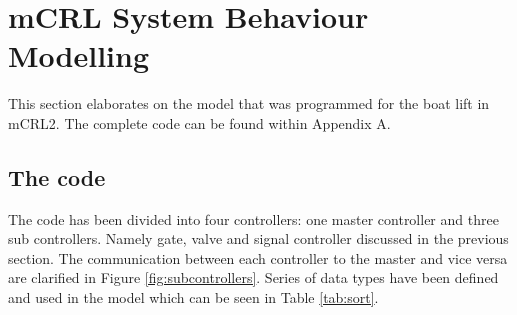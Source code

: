 \section{mCRL System Behaviour Modelling}
This section elaborates on the model that was programmed for the boat lift in mCRL2. The complete code can be found within Appendix A.
\subsection{The code}
The code has been divided into four controllers: one master controller and three sub controllers. Namely gate, valve and signal controller discussed in the previous section. The communication between each controller to the master and vice versa are clarified in Figure \ref{fig:subcontrollers}.
Series of data types have been defined and used in the model which can be seen in Table \ref{tab:sort}.


